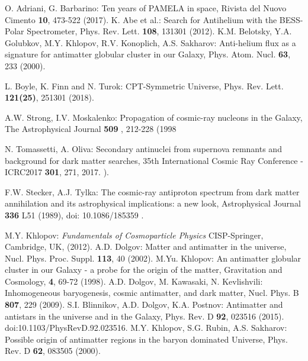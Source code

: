 \documentclass{article}
\begin{document}
\begin{thebibliography}{99}

 O. Adriani, G. Barbarino: Ten years of PAMELA in space, Rivista del Nuovo Cimento {\bf 10}, 473-522 (2017).
 K. Abe et al.: Search for Antihelium with the BESS-Polar Spectrometer, Phys. Rev. Lett. {\bf 108}, 131301 (2012). 
 K.M. Belotsky, Y.A. Golubkov, M.Y. Khlopov, R.V. Konoplich, A.S. Sakharov: Anti-helium flux as a signature for antimatter globular cluster in our Galaxy, Phys. Atom. Nucl. {\bf 63}, 233 (2000).




 L. Boyle, K. Finn and N. Turok: CPT-Symmetric Universe,  Phys. Rev. Lett. {\bf 121(25)}, 251301 (2018).




 A.W. Strong, I.V. Moskalenko: Propagation of cosmic-ray nucleons in the Galaxy, The Astrophysical Journal {\bf 509 }, 212-228 (1998

 N. Tomassetti, A. Oliva: Secondary antinuclei from supernova remnants and background for dark matter searches, 35th International Cosmic Ray Conference - ICRC2017 {\bf 301}, 271, 2017.
).
 


 F.W. Stecker, A.J. Tylka: The cosmic-ray antiproton spectrum from dark matter annihilation and its astrophysical implications: a new look, Astrophysical Journal {\bf 336} L51 (1989), doi: 10.1086/185359 .




 M.Y. Khlopov: {\em Fundamentals of Cosmoparticle Physics} CISP-Springer, Cambridge, UK, (2012).
 A.D. Dolgov: Matter and antimatter in the universe, Nucl. Phys. Proc. Suppl. {\bf 113}, 40 (2002).
 M.Yu. Khlopov: An antimatter globular cluster in our Galaxy - a probe for the origin of the matter, Gravitation and Cosmology, \textbf{4}, 69-72 (1998).
 A.D. Dolgov, M. Kawasaki, N. Kevlishvili: Inhomogeneous baryogenesis,  cosmic  antimatter, and  dark  matter, Nucl. Phys. B {\bf 807}, 229 (2009).
 S.I. Blinnikov, A.D. Dolgov, K.A. Postnov: Antimatter and antistars in the universe and in the Galaxy, Phys. Rev. D {\bf 92}, 023516 (2015). doi:10.1103/PhysRevD.92.023516. 
%
  M.Y. Khlopov, S.G. Rubin, A.S. Sakharov: Possible origin of antimatter regions in the baryon dominated Universe, Phys. Rev. D {\bf 62}, 083505 (2000).  
   


\end{thebibliography}
\end{document}
